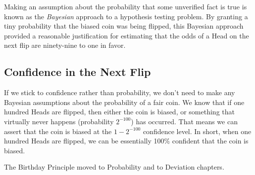 Making an assumption about the probability that some unverified fact
is true is known as the \emph{Bayesian} approach to a hypothesis
testing problem.  By granting a tiny probability that the biased coin
was being flipped, this Bayesian approach provided a reasonable
justification for estimating that the odds of a Head on the next flip
are ninety-nine to one in favor.

\subsection{Confidence in the Next Flip}

If we stick to confidence rather than probability, we don't need to
make any Bayesian assumptions about the probability of a fair coin.
We know that if one hundred Heads are flipped, then either the coin is
biased, or something that virtually never happens (probability
$2^{-100}$) has occurred.  That means we can assert that the coin is
biased at the $1-2^{-100}$ confidence level.  In short, when one
hundred Heads are flipped, we can be essentially 100\% confident that
the coin is biased.

\begin{problems}

\practiceproblems
{}
\end{problems}

\begin{editingnotes}
The Birthday Principle %
moved to Probability and to Deviation chapters.
\end{editingnotes}


\endinput


